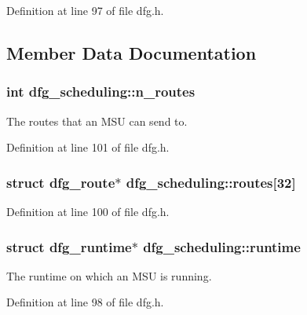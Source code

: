 Definition at line 97 of file dfg.\-h.



\subsection{Member Data Documentation}
\hypertarget{structdfg__scheduling_a9b5a55e6c50816ff72a84c246560d907}{
\subsubsection[{n\-\_\-routes}]{\setlength{\rightskip}{0pt plus 5cm}int dfg\-\_\-scheduling\-::n\-\_\-routes}}\label{structdfg__scheduling_a9b5a55e6c50816ff72a84c246560d907}


The routes that an M\-S\-U can send to. 



Definition at line 101 of file dfg.\-h.

\hypertarget{structdfg__scheduling_abc82b642d4cdf20c3cb1d3de7b931fed}{
\subsubsection[{routes}]{\setlength{\rightskip}{0pt plus 5cm}struct {\bf dfg\-\_\-route}$\ast$ dfg\-\_\-scheduling\-::routes\mbox{[}32\mbox{]}}}\label{structdfg__scheduling_abc82b642d4cdf20c3cb1d3de7b931fed}


Definition at line 100 of file dfg.\-h.

\hypertarget{structdfg__scheduling_aadf67d30ca6ed713e50b99fc6ca7fff0}{
\subsubsection[{runtime}]{\setlength{\rightskip}{0pt plus 5cm}struct {\bf dfg\-\_\-runtime}$\ast$ dfg\-\_\-scheduling\-::runtime}}\label{structdfg__scheduling_aadf67d30ca6ed713e50b99fc6ca7fff0}


The runtime on which an M\-S\-U is running. 



Definition at line 98 of file dfg.\-h.

